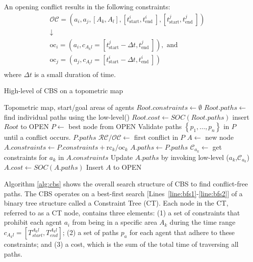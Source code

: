 \documentclass[letterpaper, 10 pt, conference]{ieeeconf}  %
\begin{document}
An opening conflict results in the following constraints: 
\begin{equation}
\begin{matrix}
    \mathcal{OC}=\left(a_i, a_j,[A_k,A_l],[t_{\mathrm{start}}^i, t_{\text {end }}^i],[t_{\mathrm{start}}^j, t_{\text {end }}^j]\right) \\
    \downarrow\\
    \mathrm{oc}_i=\left(a_i,c_{A_kl}=[t_{\mathrm{start}}^j-\Delta t, t_{\text {end }}^j]\right), \text{ and } \\\mathrm{oc}_j=\left(a_j,c_{A_ll}=[t_{\mathrm{start}}^i-\Delta t, t_{\text {end }}^i]\right)\\
\end{matrix}
\end{equation} 
where $\Delta t$ is a small duration of time.

\begin{algorithm}[tb]
\caption{High-level of CBS on a topometric map}
\label{alg:cbs}
\begin{algorithmic}[1]
\Require Topometric map, start/goal areas of agents
\State $Root.constraints \leftarrow \emptyset$ \label{line:start1}
\State $Root.paths \leftarrow$ find individual paths using the low-level()
\State $Root.cost \leftarrow SOC(Root.paths)$
\State insert $Root$ to OPEN \label{line:start2}
 \label{line:bfs1}
    \State $P \leftarrow$ best node from OPEN  \label{line:bfs2}
    \small
    \State Validate paths $\left\{p_1, \ldots, p_n\right\}$ in $P$ until a conflict occurs. \label{lines:return1}
    \normalsize
        \State \Return $P.paths$ 
    \EndIf \label{lines:return2}
    \State $\mathcal{RC}/\mathcal{OC}\leftarrow$ first conflict in $P$ \label{line:detect conflict} 
    \label{line:newnode_start}
        \State $A \leftarrow$ new node 
        \small
        \State $A.constraints \leftarrow P.constraints+ \mathrm{rc}_k/\mathrm{oc}_k$\label{line:newnode_end}
        \normalsize
        \State $A.paths \leftarrow P.paths$\label{line:lowlevel_start}
        \State $\mathcal{C}_{a_k} \leftarrow$ get constraints for $a_k$ in $A.constraints$
        \State Update $A.paths$ by invoking low-level ($a_k$,$\mathcal{C}_{a_k}$)
        \State $A.cost \leftarrow SOC(A.paths)$
        \State Insert $A$ to OPEN \label{line:lowlevel_end}
    \EndFor
\EndWhile
\end{algorithmic}
\end{algorithm}
Algorithm \ref{alg:cbs} shows the overall search structure of CBS to find conflict-free paths. The CBS operates on a best-first search [Lines~\ref{line:bfs1}-\ref{line:bfs2}] of a binary tree structure called a Constraint Tree (CT). Each node in the CT, referred to as a CT node, contains three elements: (1) a set of constraints that prohibit each agent $a_i$ from being in a specific area $A_k$ during the time range $c_{A_{k}l} = [T_{start}^{A_{k}l}, T_{end}^{A_{k}l}]$; (2) a set of paths $p_a$ for each agent that adhere to these constraints; and (3) a cost, which is the sum of the total time of traversing all paths.
\end{document}
